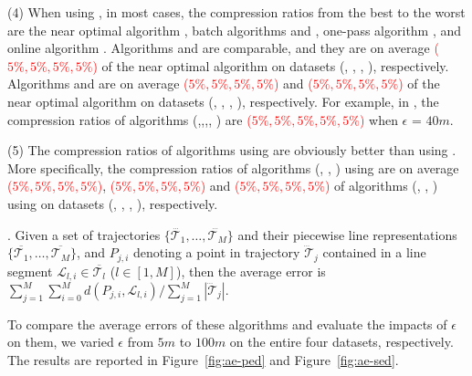 \sstab (4) When using \sed, in most cases, the compression ratios from the best to the worst are the near optimal algorithm \nopts, batch algorithms \tpa and \dpa, one-pass algorithm \cised, and online algorithm \squishe. Algorithms \tpa and \dpa are comparable, and they are on average \textcolor{red}{($5\%,5\%,5\%,5\%$)} of the near optimal algorithm \nopts on datasets (\ucar, \geolife, \mopsi, \act), respectively. Algorithms \cised and \squishe are on average \textcolor{red}{($5\%,5\%,5\%,5\%$)} and \textcolor{red}{($5\%,5\%,5\%,5\%$)} of the near optimal algorithm \nopts on datasets (\ucar, \geolife, \mopsi, \act), respectively.
For example, in \mopsi, the compression ratios of algorithms (\nopts,\tpa,\dpa,\squishe, \cised) are \textcolor{red}{($5\%, 5\%,5\%,5\%,5\%$)} when $\epsilon$ = $40m$.

\sstab (5) The compression ratios of algorithms using \ped are obviously better than using \sed. More specifically, the compression ratios of algorithms (\optp, \tpa, \dpa) using \ped are on average \textcolor{red}{($5\%,5\%,5\%,5\%$)}, \textcolor{red}{($5\%,5\%,5\%,5\%$)} and \textcolor{red}{($5\%,5\%,5\%,5\%$)} of algorithms (\nopts, \tpa, \dpa) using \sed on datasets (\ucar, \geolife, \mopsi, \act), respectively.
	





.
Given a set of trajectories $\{\dddot{\mathcal{T}_1}, \ldots, \dddot{\mathcal{T}_M}\}$ and their piecewise line representations
$\{\overline{\mathcal{T}_1}, \ldots, \overline{\mathcal{T}_M}\}$, and $P_{j,i}$ denoting
a point in trajectory $\dddot{\mathcal{T}}_j$ contained in a line segment $\mathcal{L}_{l,i}\in\overline{\mathcal{T}_l}$ ($l\in[1,M]$),
then the average error is $\sum_{j=1}^{M}\sum_{i=0}^{M} d(P_{j,i},
\mathcal{L}_{l,i})/\sum_{j=1}^{M}{|\dddot{\mathcal{T}}_j |}$.

To compare the average errors of these algorithms and evaluate the impacts of $\epsilon$ on them, we varied $\epsilon$ from $5m$ to $100m$ on the entire four datasets, respectively.
The results are reported in Figure~\ref{fig:ae-ped} and Figure~\ref{fig:ae-sed}.



